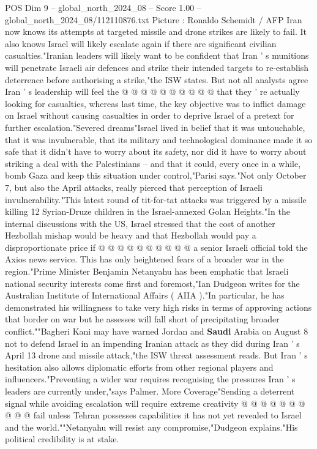 \begin{textsample}{POS Dim 9 – global\_north\_2024\_08 – Score 1.00 – global\_north\_2024\_08/112110876.txt}
Picture : Ronaldo Schemidt / AFP Iran now knows its attempts at targeted missile and drone strikes are likely to fail.
It also knows Israel will likely escalate again if there are significant civilian casualties."Iranian leaders will likely want to be confident that Iran ' s munitions will penetrate Israeli air defences and strike their intended targets to re-establish deterrence before authorising a strike,"the ISW states.
But not all analysts agree Iran ' s leadership will feel the @ @ @ @ @ @ @ @ @ @ that they ' re actually looking for casualties, whereas last time, the key objective was to inflict damage on Israel without causing casualties in order to deprive Israel of a pretext for further escalation."Severed dreams"Israel lived in belief that it was untouchable, that it was invulnerable, that its military and technological dominance made it so safe that it didn't have to worry about its safety, nor did it have to worry about striking a deal with the Palestinians -- and that it could, every once in a while, bomb Gaza and keep this situation under control,"Parisi says."Not only October 7, but also the April attacks, really pierced that perception of Israeli invulnerability."This latest round of tit-for-tat attacks was triggered by a missile killing 12 Syrian-Druze children in the Israel-annexed Golan Heights."In the internal discussions with the US, Israel stressed that the cost of another Hezbollah mishap would be heavy and that Hezbollah would pay a disproportionate price if @ @ @ @ @ @ @ @ @ @ a senior Israeli official told the Axios news service.
This has only heightened fears of a broader war in the region."Prime Minister Benjamin Netanyahu has been emphatic that Israeli national security interests come first and foremost,"Ian Dudgeon writes for the Australian Institute of International Affairs ( AIIA )."In particular, he has demonstrated his willingness to take very high risks in terms of approving actions that border on war but he assesses will fall short of precipitating broader conflict.""Bagheri Kani may have warned Jordan and \textbf{Saudi} Arabia on August 8 not to defend Israel in an impending Iranian attack as they did during Iran ' s April 13 drone and missile attack,"the ISW threat assessment reads.
But Iran ' s hesitation also allows diplomatic efforts from other regional players and influencers."Preventing a wider war requires recognising the pressures Iran ' s leaders are currently under,"says Palmer.
More Coverage"Sending a deterrent signal while avoiding escalation will require extreme creativity @ @ @ @ @ @ @ @ @ @ fail unless Tehran possesses capabilities it has not yet revealed to Israel and the world.""Netanyahu will resist any compromise,"Dudgeon explains."His political credibility is at stake.

\end{textsample}
